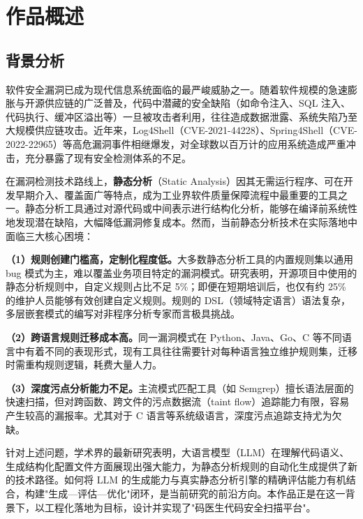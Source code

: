 \documentclass[a4paper,12pt,UTF8]{ctexart}
\numberwithin{figure}{section}
\numberwithin{table}{section}
\numberwithin{equation}{section}
\begin{document}
\section{作品概述}

\subsection{背景分析}

{\songti
软件安全漏洞已成为现代信息系统面临的最严峻威胁之一。随着软件规模的急速膨胀与开源供应链的广泛普及，代码中潜藏的安全缺陷（如命令注入、SQL 注入、代码执行、缓冲区溢出等）一旦被攻击者利用，往往造成数据泄露、系统失陷乃至大规模供应链攻击。近年来，Log4Shell（CVE-2021-44228）、Spring4Shell（CVE-2022-22965）等高危漏洞事件相继爆发，对全球数以百万计的应用系统造成严重冲击，充分暴露了现有安全检测体系的不足。

在漏洞检测技术路线上，\textbf{静态分析}（Static Analysis）因其无需运行程序、可在开发早期介入、覆盖面广等特点，成为工业界软件质量保障流程中最重要的工具之一\cite{beller2016}。静态分析工具通过对源代码或中间表示进行结构化分析，能够在编译前系统性地发现潜在缺陷，大幅降低漏洞修复成本。然而，当前静态分析技术在实际落地中面临三大核心困境：

\textbf{（1）规则创建门槛高，定制化程度低。}大多数静态分析工具的内置规则集以通用 bug 模式为主，难以覆盖业务项目特定的漏洞模式。研究表明，开源项目中使用的静态分析规则中，自定义规则占比不足 5\%\cite{beller2016}；即便在短期培训后，也仅有约 25\% 的维护人员能够有效创建自定义规则\cite{mendonca2022}。规则的 DSL（领域特定语言）语法复杂，多层嵌套模式的编写对非程序分析专家而言极具挑战。

\textbf{（2）跨语言规则迁移成本高。}同一漏洞模式在 Python、Java、Go、C 等不同语言中有着不同的表现形式，现有工具往往需要针对每种语言独立维护规则集，迁移时需重构规则逻辑，耗费大量人力。

\textbf{（3）深度污点分析能力不足。}主流模式匹配工具（如 Semgrep）擅长语法层面的快速扫描，但对跨函数、跨文件的污点数据流（taint flow）追踪能力有限，容易产生较高的漏报率。尤其对于 C 语言等系统级语言，深度污点追踪支持尤为欠缺。

针对上述问题，学术界的最新研究表明，大语言模型（LLM）在理解代码语义、生成结构化配置文件方面展现出强大能力，为静态分析规则的自动化生成提供了新的技术路径\cite{hou2025}。如何将 LLM 的生成能力与真实静态分析引擎的精确评估能力有机结合，构建"生成—评估—优化"闭环，是当前研究的前沿方向。本作品正是在这一背景下，以工程化落地为目标，设计并实现了"码医生代码安全扫描平台"。
\par}
\end{document}
